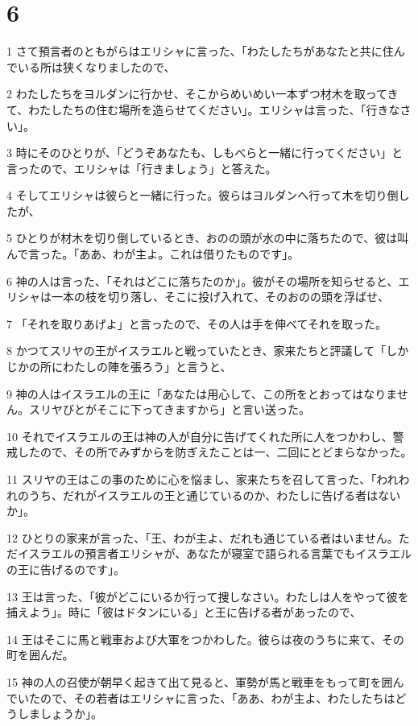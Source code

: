 \chapter{6}

\par 1 さて預言者のともがらはエリシャに言った、「わたしたちがあなたと共に住んでいる所は狭くなりましたので、
\par 2 わたしたちをヨルダンに行かせ、そこからめいめい一本ずつ材木を取ってきて、わたしたちの住む場所を造らせてください」。エリシャは言った、「行きなさい」。
\par 3 時にそのひとりが、「どうぞあなたも、しもべらと一緒に行ってください」と言ったので、エリシャは「行きましょう」と答えた。
\par 4 そしてエリシャは彼らと一緒に行った。彼らはヨルダンへ行って木を切り倒したが、
\par 5 ひとりが材木を切り倒しているとき、おのの頭が水の中に落ちたので、彼は叫んで言った。「ああ、わが主よ。これは借りたものです」。
\par 6 神の人は言った、「それはどこに落ちたのか」。彼がその場所を知らせると、エリシャは一本の枝を切り落し、そこに投げ入れて、そのおのの頭を浮ばせ、
\par 7 「それを取りあげよ」と言ったので、その人は手を伸べてそれを取った。
\par 8 かつてスリヤの王がイスラエルと戦っていたとき、家来たちと評議して「しかじかの所にわたしの陣を張ろう」と言うと、
\par 9 神の人はイスラエルの王に「あなたは用心して、この所をとおってはなりません。スリヤびとがそこに下ってきますから」と言い送った。
\par 10 それでイスラエルの王は神の人が自分に告げてくれた所に人をつかわし、警戒したので、その所でみずからを防ぎえたことは一、二回にとどまらなかった。
\par 11 スリヤの王はこの事のために心を悩まし、家来たちを召して言った、「われわれのうち、だれがイスラエルの王と通じているのか、わたしに告げる者はないか」。
\par 12 ひとりの家来が言った、「王、わが主よ、だれも通じている者はいません。ただイスラエルの預言者エリシャが、あなたが寝室で語られる言葉でもイスラエルの王に告げるのです」。
\par 13 王は言った、「彼がどこにいるか行って捜しなさい。わたしは人をやって彼を捕えよう」。時に「彼はドタンにいる」と王に告げる者があったので、
\par 14 王はそこに馬と戦車および大軍をつかわした。彼らは夜のうちに来て、その町を囲んだ。
\par 15 神の人の召使が朝早く起きて出て見ると、軍勢が馬と戦車をもって町を囲んでいたので、その若者はエリシャに言った、「ああ、わが主よ、わたしたちはどうしましょうか」。
